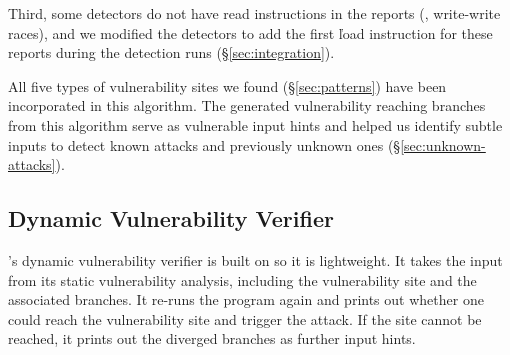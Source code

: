 Third, some detectors do not have read instructions in the reports (\eg, 
write-write races), and we modified the detectors to add the first \v{load} 
instruction for these reports during the detection runs 
(\S\ref{sec:integration}).


All five types of vulnerability sites we found (\S\ref{sec:patterns}) have
been incorporated in this algorithm. The generated vulnerability reaching branches
from this algorithm serve as vulnerable input hints and helped us identify
subtle inputs to detect \nknownVul known attacks and \nunknownVul previously
unknown ones (\S\ref{sec:unknown-attacks}).


\subsection{Dynamic Vulnerability Verifier} \label{sec:vulnerability_verifier}
\xxx's dynamic vulnerability verifier is built on \lldb so it is lightweight. 
It takes the input from its static vulnerability analysis, including the 
vulnerability site and the associated branches. It re-runs the program  again 
and prints out whether one could reach the vulnerability site and trigger the 
attack. If the site cannot be reached, it prints out the diverged branches as 
further input hints.

